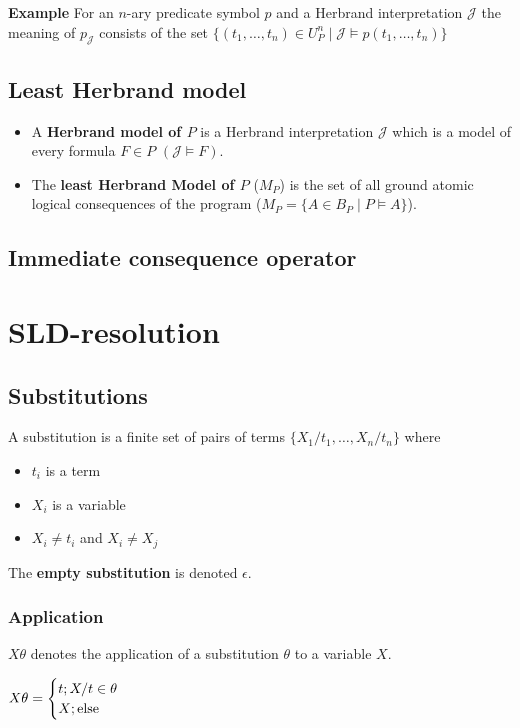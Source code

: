 \documentclass{article}
\begin{document}
\textbf{Example} For an $n$-ary predicate symbol $p$ and a Herbrand interpretation $\mathcal{J}$ the meaning of $p_\mathcal{J}$ consists of the set $\{(t_1,\ldots,t_n)\in U^n_P\mid \mathcal{J}\models p(t_1,\ldots,t_n)\}$
\subsection{Least Herbrand model}
\begin{itemize}
  \item A \textbf{Herbrand model of $P$} is a Herbrand interpretation $\mathcal{J}$ which is a model of every formula $F\in P$ $(\mathcal{J}\models F)$.
  \item The \textbf{least Herbrand Model of $P$} ($M_P$) is the set of all ground atomic logical consequences of the program ($M_P = \{A\in B_P \mid P\models A\}$).
\end{itemize}
\subsection{Immediate consequence operator}
\section{SLD-resolution}

\subsection{Substitutions}
A substitution is a finite set of pairs of terms $\{X_1/t_1,\ldots,X_n/t_n\}$ where
\begin{itemize}
    \item $t_i$ is a term
    \item $X_i$ is a variable
    \item $X_i\not=t_i$ and $X_i\not=X_j$
\end{itemize}
The \textbf{empty substitution} is denoted $\epsilon$.

\subsubsection{Application}

$X\theta$ denotes the application of a substitution $\theta$ to a variable $X$.

$X\theta=\begin{cases}
    t; X/t\in\theta\\
    X; \textmd{else}
\end{cases}
$
\end{document}
